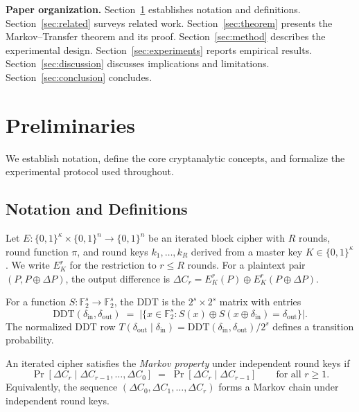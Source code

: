 \documentclass[runningheads]{llncs}
\begin{document}
\smallskip\noindent\textbf{Paper organization.}
Section~\ref{sec:prelim} establishes notation and definitions.
Section~\ref{sec:related} surveys related work.
Section~\ref{sec:theorem} presents the Markov--Transfer theorem and its proof.
Section~\ref{sec:method} describes the experimental design.
Section~\ref{sec:experiments} reports empirical results.
Section~\ref{sec:discussion} discusses implications and limitations.
Section~\ref{sec:conclusion} concludes.


\section{Preliminaries}
\label{sec:prelim}

We establish notation, define the core cryptanalytic concepts, and formalize the experimental protocol used throughout.

\subsection{Notation and Definitions}

Let $E: \{0,1\}^\kappa \times \{0,1\}^n \to \{0,1\}^n$ be an iterated block cipher with $R$ rounds, round function $\pi$, and round keys $k_1, \ldots, k_R$ derived from a master key $K \in \{0,1\}^\kappa$.
We write $E^r_K$ for the restriction to $r \leq R$ rounds.
For a plaintext pair $(P, P \oplus \Delta P)$, the output difference is $\Delta C_r = E^r_K(P) \oplus E^r_K(P \oplus \Delta P)$.

\begin{definition}
\label{def:ddt}
For a function $S: \mathbb{F}_2^s \to \mathbb{F}_2^s$, the DDT is the $2^s \times 2^s$ matrix with entries
\[
  \mathrm{DDT}(\delta_{\mathrm{in}}, \delta_{\mathrm{out}})
  \;=\;
  \bigl|\{x \in \mathbb{F}_2^s : S(x) \oplus S(x \oplus \delta_{\mathrm{in}}) = \delta_{\mathrm{out}}\}\bigr|.
\]
The normalized DDT row $T(\delta_{\mathrm{out}} \mid \delta_{\mathrm{in}}) = \mathrm{DDT}(\delta_{\mathrm{in}}, \delta_{\mathrm{out}}) / 2^s$ defines a transition probability.
\end{definition}

\begin{definition}
\label{def:markov}
An iterated cipher satisfies the \emph{Markov property} under independent round keys if
\[
  \Pr[\Delta C_r \mid \Delta C_{r-1}, \ldots, \Delta C_0]
  \;=\;
  \Pr[\Delta C_r \mid \Delta C_{r-1}]
  \qquad \text{for all } r \geq 1.
\]
Equivalently, the sequence $(\Delta C_0, \Delta C_1, \ldots, \Delta C_r)$ forms a Markov chain under independent round keys.
\end{definition}
\end{document}
